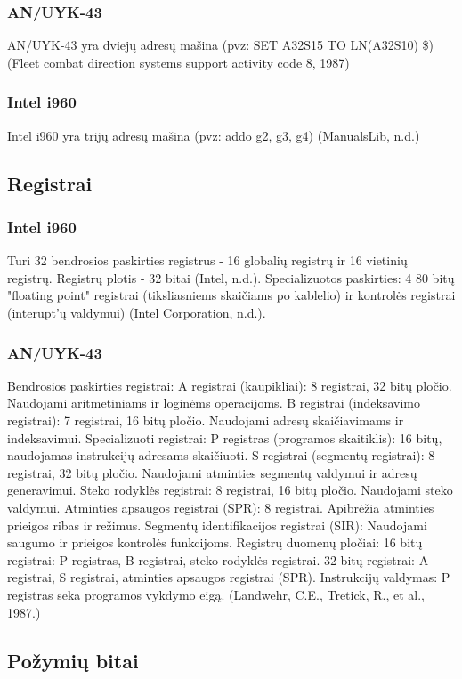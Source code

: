 \documentclass{article}
\begin{document}
\subsubsection{AN/UYK-43}
AN/UYK-43 yra dviejų adresų mašina (pvz: SET A32S15 TO LN(A32S10) \$) (Fleet combat direction systems support activity code 8, 1987)
\subsubsection{Intel i960}
Intel i960 yra trijų adresų mašina (pvz: addo g2, g3, g4) (ManualsLib, n.d.)
\subsection{Registrai}
\subsubsection{Intel i960}
Turi 32 bendrosios paskirties registrus - 16 globalių registrų ir 16 vietinių registrų. Registrų plotis - 32 bitai (Intel, n.d.). Specializuotos paskirties: 4 80 bitų "floating point" registrai (tiksliasniems skaičiams po kablelio) ir kontrolės registrai (interupt'ų valdymui) (Intel Corporation, n.d.).
\subsubsection{AN/UYK-43}
Bendrosios paskirties registrai: A registrai (kaupikliai): 8 registrai, 32 bitų pločio. Naudojami aritmetiniams ir loginėms operacijoms.
B registrai (indeksavimo registrai): 7 registrai, 16 bitų pločio. Naudojami adresų skaičiavimams ir indeksavimui. Specializuoti registrai: P registras (programos skaitiklis): 16 bitų, naudojamas instrukcijų adresams skaičiuoti. S registrai (segmentų registrai): 8 registrai, 32 bitų pločio. Naudojami atminties segmentų valdymui ir adresų generavimui.
Steko rodyklės registrai: 8 registrai, 16 bitų pločio. Naudojami steko valdymui. Atminties apsaugos registrai (SPR): 8 registrai. Apibrėžia atminties prieigos ribas ir režimus. Segmentų identifikacijos registrai (SIR): Naudojami saugumo ir prieigos kontrolės funkcijoms. Registrų duomenų pločiai: 16 bitų registrai: P registras, B registrai, steko rodyklės registrai. 32 bitų registrai: A registrai, S registrai, atminties apsaugos registrai (SPR). Instrukcijų valdymas: P registras seka programos vykdymo eigą. (Landwehr, C.E., Tretick, R., et al., 1987.)
\subsection{Požymių bitai}
\end{document}
